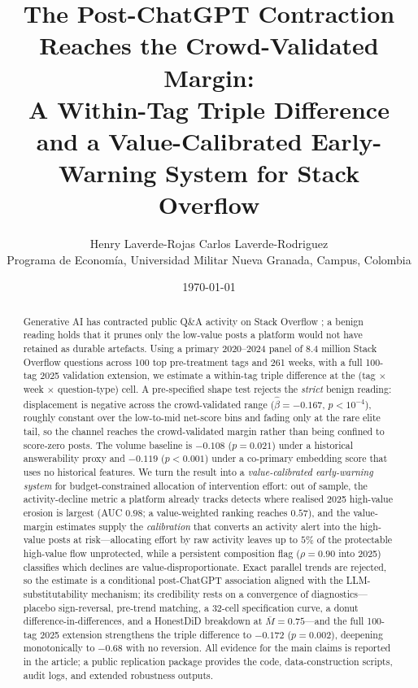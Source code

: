 \documentclass[12pt]{article}
\title{The Post-ChatGPT Contraction Reaches the Crowd-Validated Margin:\\
A Within-Tag Triple Difference and a Value-Calibrated
Early-Warning System for Stack Overflow}
\author{Henry Laverde-Rojas \quad Carlos Laverde-Rodriguez \\
Programa de Econom\'ia, Universidad Militar Nueva Granada, Campus, Colombia}
\date{\today}
\begin{document}
\maketitle

\begin{abstract}
\noindent
Generative AI has contracted public Q\&A activity on Stack
Overflow \citep{burtch2024chatgpt,delriochanona2024large,xue2026chatgpt};
a benign reading holds that it prunes only the low-value posts
a platform would not have retained as durable artefacts. Using
a primary 2020--2024 panel of 8.4 million Stack Overflow
questions across 100 top pre-treatment tags and 261 weeks, with
a full 100-tag 2025 validation extension, we estimate a
within-tag triple difference at the (tag $\times$ week
$\times$ question-type) cell. A pre-specified shape test
rejects the \emph{strict} benign reading: displacement is
negative across the crowd-validated range
($\hat\beta=-0.167$, $p<10^{-4}$), roughly constant over
the low-to-mid net-score bins and fading only at the rare
elite tail, so the channel reaches the crowd-validated margin
rather than being confined to score-zero posts. The volume
baseline is $-0.108$ ($p=0.021$) under a historical
answerability proxy and $-0.119$ ($p<0.001$) under a co-primary
embedding score that uses no historical features. We turn the
result into a \emph{value-calibrated early-warning system} for
budget-constrained allocation of intervention effort: out of
sample, the activity-decline metric a platform already tracks
detects where realised 2025 high-value erosion is largest
(AUC $0.98$; a value-weighted ranking reaches $0.57$), and the
value-margin estimates supply the \emph{calibration} that
converts an activity alert into the high-value posts at
risk---allocating effort by raw activity leaves up to $5\%$ of
the protectable high-value flow unprotected, while a persistent
composition flag ($\rho=0.90$ into 2025) classifies which
declines are value-disproportionate. Exact parallel trends are
rejected, so the estimate is a conditional post-ChatGPT
association aligned with the LLM-substitutability mechanism;
its credibility rests on a convergence of diagnostics---placebo
sign-reversal, pre-trend matching, a 32-cell specification
curve, a donut difference-in-differences, and a HonestDiD
breakdown at $\bar M=0.75$---and the full 100-tag 2025 extension
strengthens the triple difference to $-0.172$ ($p=0.002$),
deepening monotonically to $-0.68$ with no reversion. All
evidence for the main claims is reported in the article; a
public replication package provides the code, data-construction
scripts, audit logs, and extended robustness outputs.
\end{abstract}
\end{document}
